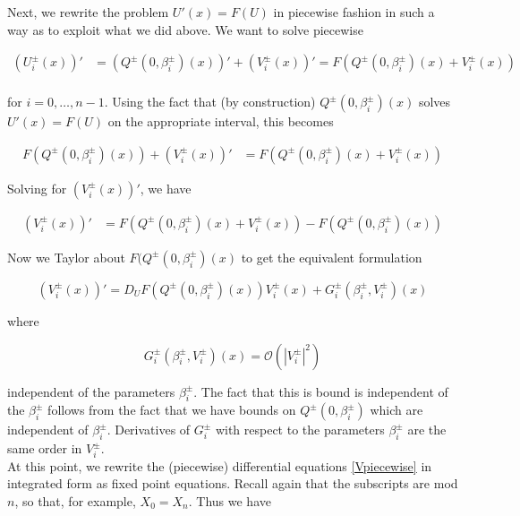 \documentclass[12pt]{article}
\begin{document}

Next, we rewrite the problem $U'(x) = F(U)$ in piecewise fashion in such a way as to exploit what we did above. We want to solve piecewise

\begin{align*}
(U_i^\pm(x))' &= (Q^\pm(0, \beta_i^\pm)(x))' + (V_i^\pm(x))' = F\left(Q^\pm(0, \beta_i^\pm)(x) + V_i^\pm(x) \right) \\
\end{align*}

for $i = 0, \dots, n-1$. Using the fact that (by construction) $Q^\pm(0, \beta_i^\pm)(x)$ solves $U'(x) = F(U)$ on the appropriate interval, this becomes

\begin{align*}
F(Q^\pm(0, \beta_i^\pm)(x)) + (V_i^\pm(x))' &= F(Q^\pm(0, \beta_i^\pm)(x) + V_i^\pm(x) )
\end{align*}

Solving for $(V_i^\pm(x))'$, we have

\begin{align*}
(V_i^\pm(x))' &= F(Q^\pm(0, \beta_i^\pm)(x) + V_i^\pm(x) ) - F(Q^\pm(0, \beta_i^\pm)(x) )
\end{align*}

Now we Taylor about $F(Q^\pm(0, \beta_i^\pm)(x)$ to get the equivalent formulation

\begin{equation}\label{Vpiecewise}
(V_i^\pm(x))' = D_U F(Q^\pm(0, \beta_i^\pm)(x)) V_i^\pm(x)  + G_i^\pm(\beta_i^\pm, V_i^\pm)(x)
\end{equation}

where 

\begin{equation}\label{Gquadratic}
G_i^\pm(\beta_i^\pm, V_i^\pm)(x) = \mathcal{O}(|V_i^\pm|^2)
\end{equation}

independent of the parameters $\beta_i^\pm$. The fact that this is bound is independent of the $\beta_i^\pm$ follows from the fact that we have bounds on $Q^\pm(0, \beta_i^\pm)$ which are independent of $\beta_i^\pm$. Derivatives of $G_i^\pm$ with respect to the parameters $\beta_i^\pm$ are the same order in $V_i^\pm$.\\

At this point, we rewrite the (piecewise) differential equations \eqref{Vpiecewise} in integrated form as fixed point equations. Recall again that the subscripts are mod $n$, so that, for example, $X_0 = X_n$. Thus we have
\end{document}
